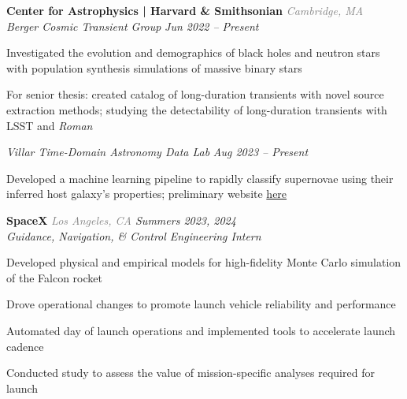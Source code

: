 \documentclass[12pt,letterpaper]{article}
\begin{document}
\textbf{Center for Astrophysics | Harvard \& Smithsonian} {\small\textit{\textcolor{gray}{Cambridge, MA}}}\\
\textit{Berger Cosmic Transient Group} {\small \textit{\hfill \textcolor{niceblue}{Jun 2022 -- Present}}}
\begin{bulletdescription}
      \item
            Investigated the evolution and demographics of black holes and neutron stars with population synthesis simulations of massive binary stars
      \item
            For senior thesis: created catalog of long-duration transients with novel source extraction methods; studying the detectability of long-duration transients with LSST and \textit{Roman}
\end{bulletdescription}
\textit{Villar Time-Domain Astronomy Data Lab} {\small \textit{\hfill \textcolor{niceblue}{Aug 2023 -- Present}}}
\begin{bulletdescription}
      \item
            Developed a machine learning pipeline to rapidly classify supernovae using their inferred host galaxy's properties; preliminary website \href{http://astrotimelab.com/_pages/splash.html}{here}
\end{bulletdescription}

\vspace{7pt}

\textbf{SpaceX} {\small\textit{\textcolor{gray}{Los Angeles, CA} \hfill \textcolor{niceblue}{Summers 2023, 2024}}}\\
\textit{Guidance, Navigation, \& Control Engineering Intern}
\begin{bulletdescription}
      \item
            Developed physical and empirical models for high-fidelity Monte Carlo simulation of the Falcon rocket
      \item
            Drove operational changes to promote launch vehicle reliability and performance
      \item
            Automated day of launch operations and implemented tools to accelerate launch cadence
      \begin{bulletdescription}
            \item
                  Conducted study to assess the value of mission-specific analyses required for launch
      \end{bulletdescription}
\end{bulletdescription}
\end{document}
